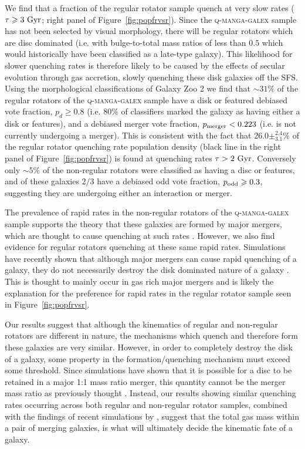 \documentclass[useAMS,usenatbib]{mn2e}
\begin{document}
We find that a fraction of the regular rotator sample quench at very slow rates ($\tau \geq 3~\rm{Gyr}$; right panel of Figure~\ref{fig:popfrvsr}). Since the \textsc{q-manga-galex} sample has not been selected by visual morphology, there will be regular rotators which are disc dominated (i.e. with bulge-to-total mass ratios of less than $0.5$ which would historically have been classified as a late-type galaxy). This likelihood for slower quenching rates is therefore likely to be caused by the effects of secular evolution through gas accretion, slowly quenching these disk galaxies off the SFS. Using the morphological classifications of Galaxy Zoo 2 \citep{lintott11, GZ2} we find that $\sim 31\%$ of the regular rotators of the \textsc{q-manga-galex} sample have a disk or featured debiased vote fraction, $p_d \geq 0.8$ (i.e. $80\%$ of classifiers marked the galaxy as having either a disk or features), and a debiased merger vote fraction, $p_{\rm{merger}} < 0.223$ (i.e. is not currently undergoing a merger). This is consistent with the fact that $26.0\pm^{2.4}_{3.1}\%$ of the regular rotator quenching rate population density (black line in the right panel of Figure~\ref{fig:popfrvsr}) is found at quenching rates $\tau > 2~\rm{Gyr}$. Conversely only $\sim5\%$ of the non-regular rotators were classified as having a disc or features, and of these galaxies $2/3$ have a debiased odd vote fraction, $p_{\rm{odd}} \geq 0.3$, suggesting they are undergoing either an interaction or merger. 

The prevalence of rapid rates in the non-regular rotators of the \textsc{q-manga-galex} sample supports the theory that these galaxies are formed by major mergers, which are thought to cause quenching at such rates \citep{springel05b, bell06, lotz08b,lotz11,smethurst15}. However, we also find evidence for regular rotators quenching at these same rapid rates. Simulations have recently shown that although major mergers can cause rapid quenching of a galaxy, they do not necessarily destroy the disk dominated nature of a galaxy \citep{pontzen16, sparre16}. This is thought to mainly occur in gas rich major mergers and is likely the explanation for the preference for rapid rates in the regular rotator sample seen in Figure~\ref{fig:popfrvsr}.

Our results suggest that although the kinematics of regular and non-regular rotators are different in nature, the mechanisms which quench and therefore form these galaxies are very similar. However, in order to completely destroy the disk of a galaxy, some property in the formation/quenching mechanism must exceed some threshold. Since simulations have shown that it is possible for a disc to be retained in a major 1:1 mass ratio merger, this quantity cannot be the merger mass ratio as previously thought \citep{binneytremaine, bois10, tonini16}. Instead, our results showing similar quenching rates occurring across both regular and non-regular rotator samples, combined with the findings of recent simulations by \cite{pontzen16, sparre16}, suggest that the total gas mass within a pair of merging galaxies, is what will ultimately decide the kinematic fate of a galaxy. 


  
\end{document}
